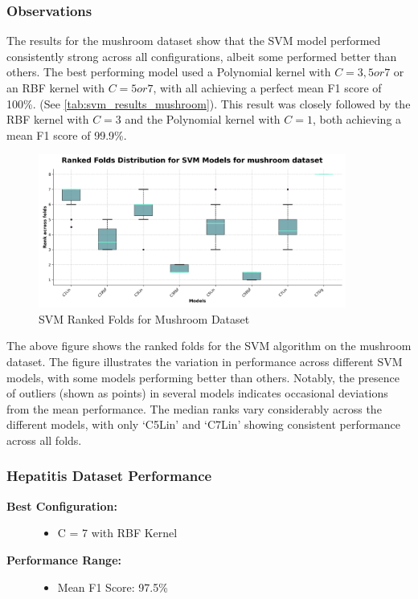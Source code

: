 \subsubsection*{Observations}
The results for the mushroom dataset show that the SVM model performed consistently strong across all configurations,
albeit some performed better than others. The best performing model used a Polynomial kernel with $C=3, 5 or 7$
or an RBF kernel with $C=5 or 7$, with all achieving a perfect mean F1 score of 100\%.
(See \autoref{tab:svm_results_mushroom}).
This result was closely followed by the RBF kernel with $C=3$ and the Polynomial kernel with $C=1$, both achieving a mean F1 score of 99.9\%.

\begin{figure}
    \centering
    \includegraphics[width=0.9\textwidth]{figures/ranked_folds_SVM_mushroom.png}
    \caption{SVM Ranked Folds for Mushroom Dataset}
    \label{fig:ranked_folds_SVM_mushroom}
\end{figure}

The above figure shows the ranked folds for the SVM algorithm on the mushroom dataset.
The figure illustrates the variation in performance across different SVM models, with some models performing 
better than others. Notably, the presence of outliers (shown as points) in several models indicates
occasional deviations from the mean performance. The median ranks vary considerably across the different models,
with only `C5Lin' and `C7Lin' showing consistent performance across all folds.

\subsubsection{Hepatitis Dataset Performance}



\begin{description}
    \item[\textbf{Best Configuration:}]\leavevmode
        \begin{itemize}
            \item C = 7 with RBF Kernel
        \end{itemize}
    
    \item[\textbf{Performance Range:}]\leavevmode
        \begin{itemize}
            \item Mean F1 Score: 97.5\%
        \end{itemize}
\end{description}

